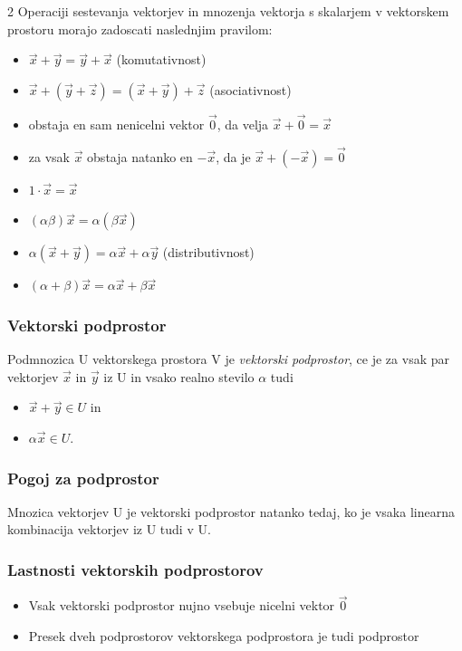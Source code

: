 \documentclass{article}
\begin{document}
\begin{multicols}{2}
	Operaciji sestevanja vektorjev in mnozenja vektorja s skalarjem v vektorskem prostoru
	morajo zadoscati naslednjim pravilom:
	\begin{itemize}
		\item $\vec{x} + \vec{y} = \vec{y} + \vec{x}$ (komutativnost)
		\item $\vec{x} + (\vec{y} + \vec{z}) = (\vec{x} + \vec{y}) + \vec{z}$ (asociativnost)
		\item obstaja en sam nenicelni vektor $\vec{0}$, da velja $\vec{x} + \vec{0} = \vec{x}$
		\item za vsak $\vec{x}$ obstaja natanko en $-\vec{x}$, da je $\vec{x} + (-\vec{x}) = \vec{0}$
		\item $1 \cdot \vec{x} = \vec{x}$
		\item $(\alpha\beta)\vec{x} = \alpha(\beta\vec{x})$
		\item $\alpha(\vec{x} + \vec{y}) = \alpha\vec{x} + \alpha\vec{y}$ (distributivnost)
		\item $(\alpha + \beta)\vec{x} = \alpha\vec{x} + \beta\vec{x}$
	\end{itemize}

	\subsubsection{Vektorski podprostor}

	Podmnozica U vektorskega prostora V je \textit{vektorski podprostor}, ce je za
	vsak par vektorjev $\vec{x}$ in $\vec{y}$ iz U in vsako realno stevilo $\alpha$ tudi
	\begin{itemize}
		\item $\vec{x} + \vec{y} \in U$ in
		\item $\alpha\vec{x} \in U$.
	\end{itemize}

	\subsubsection{Pogoj za podprostor}

	Mnozica vektorjev U je vektorski podprostor natanko tedaj, ko je vsaka linearna
	kombinacija vektorjev iz U tudi v U.

	\subsubsection{Lastnosti vektorskih podprostorov}

	\begin{itemize}
		\item Vsak vektorski podprostor nujno vsebuje nicelni vektor $\vec{0}$
		\item Presek dveh podprostorov vektorskega podprostora je tudi podprostor
	\end{itemize}


\end{multicols}
\end{document}
